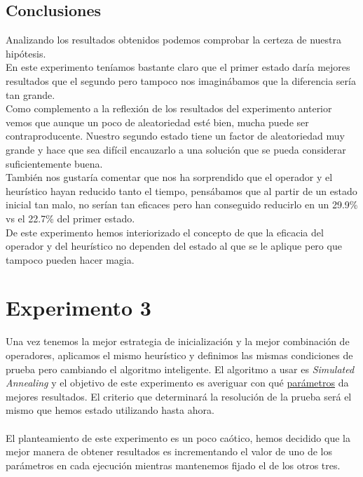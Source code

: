 \documentclass[a4paper,10pt]{report}
\begin{document}
        \subsection*{Conclusiones}
        Analizando los resultados obtenidos podemos comprobar la certeza de nuestra hipótesis.\\
        En este experimento teníamos bastante claro que el primer estado daría mejores resultados que el segundo pero tampoco nos imaginábamos que la diferencia sería tan grande.\\ 
        Como complemento a la reflexión de los resultados del experimento anterior vemos que aunque un poco de aleatoriedad esté bien, mucha puede ser contraproducente. Nuestro segundo estado tiene un factor de aleatoriedad muy grande y hace que sea difícil encauzarlo a una solución que se pueda considerar suficientemente buena.\\
        También nos gustaría comentar que nos ha sorprendido que el operador y el heurístico hayan reducido tanto el tiempo, pensábamos que al partir de un estado inicial tan malo, no serían tan eficaces pero han conseguido reducirlo en un 29.9\% vs el 22.7\% del primer estado.\\
        De este experimento hemos interiorizado el concepto de que la eficacia del operador y del heurístico no dependen del estado al que se le aplique pero que tampoco pueden hacer magia. 
        
        
        
	\newpage
	\section*{Experimento 3}

		Una vez tenemos la mejor estrategia de inicialización y la mejor combinación de operadores, aplicamos el mismo heurístico y definimos las mismas condiciones de prueba pero cambiando el algoritmo inteligente. El algoritmo a usar es \textit{Simulated Annealing} y el objetivo de este experimento es averiguar con qué \uline{parámetros} da mejores resultados. El criterio que determinará la resolución de la prueba será el mismo que hemos estado utilizando hasta ahora. \\\\
		El planteamiento de este experimento es un poco caótico, hemos decidido que la mejor manera de obtener resultados es incrementando el valor de uno de los parámetros en cada ejecución mientras mantenemos fijado el de los otros tres.\\
		
\end{document}

